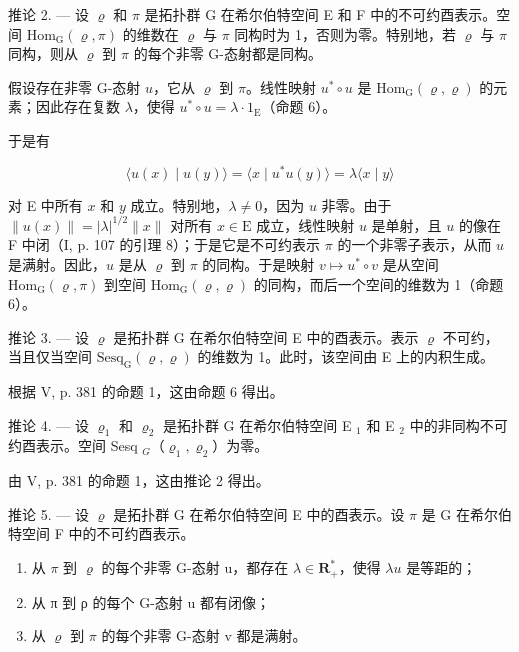 推论 2. --- 设 \(\varrho\) 和 \(\pi\) 是拓扑群 G 在希尔伯特空间 E 和 F 中的不可约酉表示。空间 \(\mathrm{Hom}_{\mathrm{G}}(\varrho, \pi)\) 的维数在 \(\varrho\) 与 \(\pi\) 同构时为 1，否则为零。特别地，若 \(\varrho\) 与 \(\pi\) 同构，则从 \(\varrho\) 到 \(\pi\) 的每个非零 G-态射都是同构。

假设存在非零 G-态射 \(u\)，它从 \(\varrho\) 到 \(\pi\)。线性映射 \(u^{*} \circ u\) 是 \(\mathrm{Hom}_{\mathrm{G}}(\varrho, \varrho)\) 的元素；因此存在复数 \(\lambda\)，使得 \(u^{*} \circ u = \lambda \cdot 1_{\mathrm{E}}\)（命题 6）。

于是有

\[
\langle u (x) \mid u (y) \rangle = \langle x \mid u ^ {*} u (y) \rangle = \lambda \langle x \mid y \rangle
\]

对 E 中所有 \(x\) 和 \(y\) 成立。特别地，\(\lambda \neq 0\)，因为 \(u\) 非零。由于 \(\| u(x)\| = |\lambda |^{1 / 2}\| x\|\) 对所有 \(x\in \mathrm{E}\) 成立，线性映射 \(u\) 是单射，且 \(u\) 的像在 F 中闭（I, p. 107 的引理 8）；于是它是不可约表示 \(\pi\) 的一个非零子表示，从而 \(u\) 是满射。因此，\(u\) 是从 \(\varrho\) 到 \(\pi\) 的同构。于是映射 \(v\mapsto u^{*}\circ v\) 是从空间 \(\mathrm{Hom}_{\mathrm{G}}(\varrho ,\pi)\) 到空间 \(\mathrm{Hom}_{\mathrm{G}}(\varrho ,\varrho)\) 的同构，而后一个空间的维数为 1（命题 6）。

推论 3. --- 设 \(\varrho\) 是拓扑群 G 在希尔伯特空间 E 中的酉表示。表示 \(\varrho\) 不可约，当且仅当空间 \(\mathrm{Sesq}_{\mathrm{G}}(\varrho, \varrho)\) 的维数为 1。此时，该空间由 E 上的内积生成。

根据 V, p. 381 的命题 1，这由命题 6 得出。

推论 4. --- 设 \(\varrho_{1}\) 和 \(\varrho_{2}\) 是拓扑群 G 在希尔伯特空间 E \(_{1}\) 和 E \(_{2}\) 中的非同构不可约酉表示。空间 Sesq \(_{G}\)（\(\varrho_{1}, \varrho_{2}\)）为零。

由 V, p. 381 的命题 1，这由推论 2 得出。

推论 5. --- 设 \(\varrho\) 是拓扑群 G 在希尔伯特空间 E 中的酉表示。设 \(\pi\) 是 G 在希尔伯特空间 F 中的不可约酉表示。

\begin{enumerate}
\def\labelenumi{\alph{enumi})}
\item
  从 \(\pi\) 到 \(\varrho\) 的每个非零 G-态射 u，都存在 \(\lambda \in \mathbf{R}_{+}^{*}\)，使得 \(\lambda u\) 是等距的；
\item
  从 π 到 ρ 的每个 G-态射 u 都有闭像；
\item
  从 \(\varrho\) 到 \(\pi\) 的每个非零 G-态射 v 都是满射。
\end{enumerate}

